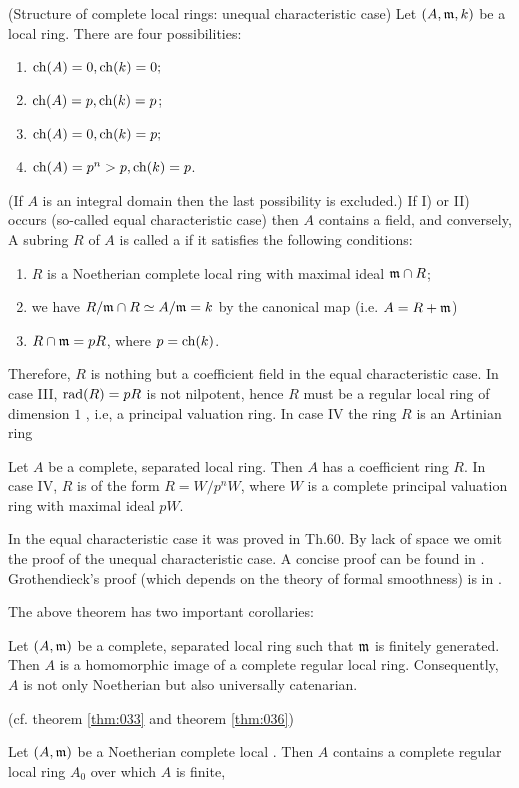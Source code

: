 \documentclass[../main]{subfiles}
\begin{document}
\newparagraph (Structure of complete local rings: unequal characteristic case) Let $(A, \mathfrak{m}, k)$ be a local ring. There are four possibilities:
\begin{enumerate}[label = \Roman*)]
    \item $\operatorname{ch}(A)=0, \operatorname{ch}(k)=0 ;$ 
    \item $\operatorname{ch}(A)=p, \operatorname{ch}(k)=p$;
    \item $\operatorname{ch}(A)=0, \operatorname{ch}(k)=p ;$
    \item $\operatorname{ch}(A)=p^n>p, \operatorname{ch}(k)=p$.
\end{enumerate}
(If $A$ is an integral domain then the last possibility is excluded.) If I) or II) occurs (so-called equal characteristic case) then $A$ contains a field, and conversely, A subring $R$ of $A$ is called a  if it satisfies the following conditions:
\begin{enumerate}[label = \arabic*)]
  \item $R$ is a Noetherian complete local ring with maximal ideal $\mathfrak{m}\cap R$;

  \item we have $R / \mathfrak{m} \cap R \simeq A/\mathfrak{m}=k$ by the canonical map (i.e. $A=R+\mathfrak{m}$)
  
  \item $R \cap \mathfrak{m}=pR$, where $p=\operatorname{ch}(k)$.
\end{enumerate}

Therefore, $R$ is nothing but a coefficient field in the equal characteristic case. In case III, $\operatorname{rad}(R)=p R$ is not nilpotent, hence $R$ must be a regular local ring of dimension $1$ , i.e, a principal valuation ring. In case IV the ring $R$ is an Artinian ring

\begin{theorem*}[I.S.Cohen]\label{thm:cohen}
Let $A$ be a complete, separated local ring. Then $A$ has a coefficient ring $R$. In case IV, $R$ is of the form $R=W / p^n W$, where $W$ is a complete principal valuation ring with maximal ideal $pW$.
\end{theorem*}

In the equal characteristic case it was proved in Th.60. By lack of space we omit the proof of the unequal characteristic case. A concise proof can be found in \cite[pp. 45-48]{samuel1953algebre}. Grothendieck's proof (which depends on the theory of formal smoothness) is in \cite{egaIV}.

The above theorem has two important corollaries: 
\begin{corollary}\label{cor:28.03}
Let $(A, \mathfrak{m})$ be a complete, separated local ring such that $\mathfrak{m}$ is finitely generated. Then $A$ is a homomorphic image of a complete regular local ring. Consequently, $A$ is not only Noetherian but also universally catenarian.
\end{corollary}
(cf. theorem \ref{thm:033} and theorem \ref{thm:036})
\begin{corollary}\label{cor:28.04}
Let $(A, \mathfrak{m})$ be a Noetherian complete local . Then $A$ contains a complete regular local ring $A_0$ over which $A$ is finite,
\end{corollary}
\end{document}
